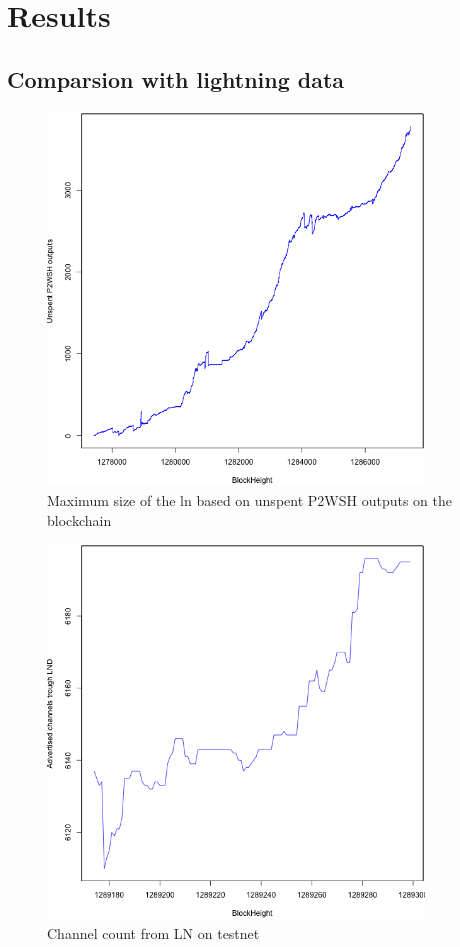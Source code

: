 \chapter{Results}
\label{chap:results}


\section{Comparsion with lightning data}

\begin{figure}[h]
    \centering
    \includegraphics[width=10cm]{figures/bclnsizeTS.png}
    \caption{Maximum size of the ln based on unspent P2WSH outputs on the blockchain}
    \label{fig:htlc_bc}
\end{figure}

\begin{figure}[t]
    \centering
    \includegraphics[width=10cm]{figures/lnsizeTS.png}
    \caption{Channel count from LN on testnet}
    \label{fig:htlc_bc}
\end{figure}

